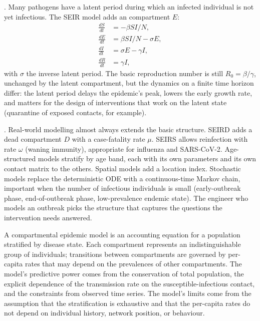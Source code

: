 . Many pathogens have a latent period during
which an infected individual is not yet infectious. The SEIR model
adds an  compartment $E$:
\begin{align*}
\frac{dS}{dt} &= -\beta S I / N, \\
\frac{dE}{dt} &= \beta S I / N - \sigma E, \\
\frac{dI}{dt} &= \sigma E - \gamma I, \\
\frac{dR}{dt} &= \gamma I,
\end{align*}
with $\sigma$ the inverse latent period. The basic reproduction number
is still $R_0 = \beta/\gamma$, unchanged by the latent compartment,
but the dynamics on a finite time horizon differ: the latent period
delays the epidemic's peak, lowers the early growth rate, and
matters for the design of interventions that work on the latent state
(quarantine of exposed contacts, for example).

. Real-world modelling almost
always extends the basic structure. SEIRD adds a dead compartment $D$
with a case-fatality rate $\mu$. SEIRS allows reinfection with rate
$\omega$ (waning immunity), appropriate for influenza and SARS-CoV-2.
Age-structured models stratify by age band, each with its own
parameters and its own contact matrix to the others. Spatial models
add a location index. Stochastic models replace the deterministic ODE
with a continuous-time Markov chain, important when the number of
infectious individuals is small (early-outbreak phase, end-of-outbreak
phase, low-prevalence endemic state). The engineer who models an
outbreak picks the structure that captures the questions the
intervention needs answered.

\begin{principle}
A compartmental epidemic model is an accounting equation for a
population stratified by disease state. Each compartment represents
an indistinguishable group of individuals; transitions between
compartments are governed by per-capita rates that may depend on
the prevalences of other compartments. The model's predictive power
comes from the conservation of total population, the explicit
dependence of the transmission rate on the susceptible-infectious
contact, and the constraints from observed time series. The model's
limits come from the assumption that the stratification is exhaustive
and that the per-capita rates do not depend on individual history,
network position, or behaviour.
\end{principle}


